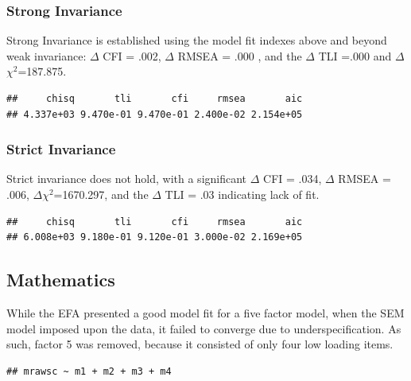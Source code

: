 \documentclass{article}\usepackage[]{graphicx}\usepackage[]{color}
\makeatletter
\newenvironment{kframe}{%
 \def\at@end@of@kframe{}%
 \ifinner\ifhmode%
  \def\at@end@of@kframe{\end{minipage}}%
  \begin{minipage}{\columnwidth}%
 \fi\fi%
 \def\FrameCommand##1{\hskip\@totalleftmargin \hskip-\fboxsep
 \colorbox{shadecolor}{##1}\hskip-\fboxsep
     \hskip-\linewidth \hskip-\@totalleftmargin \hskip\columnwidth}%
 \MakeFramed {\advance\hsize-\width
   \@totalleftmargin\z@ \linewidth\hsize
   \@setminipage}}%
 {\par\unskip\endMakeFramed%
 \at@end@of@kframe}
\newenvironment{knitrout}{}{} %
\makeatother
\begin{document}
\subsubsection{Strong Invariance}
Strong Invariance is established using the model fit indexes above and beyond weak invariance: $\Delta$ CFI = .002, $\Delta$ RMSEA = .000 , and the $\Delta$ TLI =.000 and $\Delta$$\chi^2$=187.875.
\begin{knitrout}
\color{fgcolor}\begin{kframe}
\begin{verbatim}
##     chisq       tli       cfi     rmsea       aic 
## 4.337e+03 9.470e-01 9.470e-01 2.400e-02 2.154e+05
\end{verbatim}
\end{kframe}
\end{knitrout}


\subsubsection{Strict Invariance}
Strict invariance does not hold, with a significant $\Delta$ CFI = .034, $\Delta$ RMSEA = .006, $\Delta$$\chi^2$=1670.297, and the $\Delta$ TLI = .03 indicating lack of fit.
\begin{knitrout}
\color{fgcolor}\begin{kframe}
\begin{verbatim}
##     chisq       tli       cfi     rmsea       aic 
## 6.008e+03 9.180e-01 9.120e-01 3.000e-02 2.169e+05
\end{verbatim}
\end{kframe}
\end{knitrout}

\subsection{Mathematics}
While the EFA presented a good model fit for a five factor model, when the SEM model imposed upon the data, it failed to converge due to underspecification. As such, factor 5 was removed, because it consisted of only four low loading items.
\begin{knitrout}
\color{fgcolor}\begin{kframe}
\begin{verbatim}
## mrawsc ~ m1 + m2 + m3 + m4
\end{verbatim}
\end{kframe}
\end{knitrout}
\end{document}
